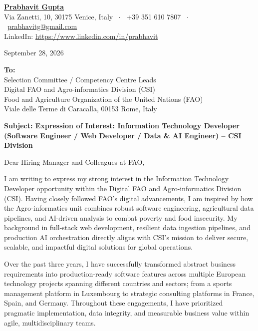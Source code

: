\documentclass[11pt,a4paper]{article}
\begin{document}
{\large \textbf{\underline{Prabhavit Gupta}}}\\
Via Zanetti, 10, 30175 Venice, Italy \ $\cdot$ \ +39 351 610 7807 \ $\cdot$ \ \href{mailto:prabhavitg@gmail.com}{prabhavitg@gmail.com}\\
LinkedIn: \href{https://www.linkedin.com/in/prabhavit/}{https://www.linkedin.com/in/prabhavit}

\vspace{10pt}
September 28, 2026

\vspace{8pt}
\textbf{To:}\\
Selection Committee / Competency Centre Leads\\
Digital FAO and Agro-informatics Division (CSI)\\
Food and Agriculture Organization of the United Nations (FAO)\\
Viale delle Terme di Caracalla, 00153 Rome, Italy

\vspace{10pt}
\textbf{Subject: Expression of Interest: Information Technology Developer (Software Engineer / Web Developer / Data \& AI Engineer) -- CSI Division}

\vspace{6pt}
Dear Hiring Manager and Colleagues at FAO,

I am writing to express my strong interest in the Information Technology Developer opportunity within the Digital FAO and Agro-informatics Division (CSI). Having closely followed FAO's digital advancements, I am inspired by how the Agro-informatics unit combines robust software engineering, agricultural data pipelines, and AI-driven analysis to combat poverty and food insecurity. My background in full-stack web development, resilient data ingestion pipelines, and production AI orchestration directly aligns with CSI's mission to deliver secure, scalable, and impactful digital solutions for global operations.

Over the past three years, I have successfully transformed abstract business requirements into production-ready software features across multiple European technology projects spanning different countries and sectors; from a sports management platform in Luxembourg to strategic consulting platforms in France, Spain, and Germany. Throughout these engagements, I have prioritized pragmatic implementation, data integrity, and measurable business value within agile, multidisciplinary teams.
\end{document}
